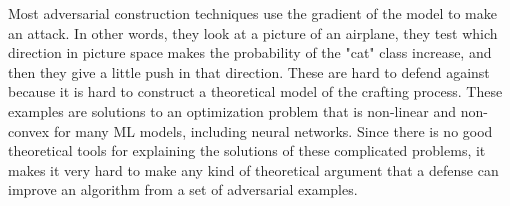 Most adversarial construction techniques use the gradient of the model to make an attack. In other words, they look at a picture of an airplane, they test which direction in picture space makes the probability of the "cat" class increase, and then they give a little push in that direction. These are hard to defend against because it is hard to construct a theoretical model of the crafting process. These examples are solutions to an optimization problem that is non-linear and non-convex for many ML models, including neural networks. Since there is no good theoretical tools for explaining the solutions of these complicated problems, it makes it very hard to make any kind of theoretical argument that a defense can improve an algorithm from a set of adversarial examples.